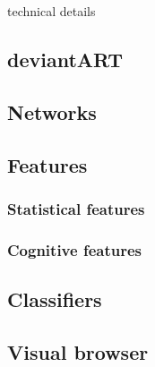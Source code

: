 technical details
\subsection{deviantART}
\subsection{Networks}
\subsection{Features}
\subsubsection{Statistical features}
\subsubsection{Cognitive features}
\subsection{Classifiers}
\subsection{Visual browser}